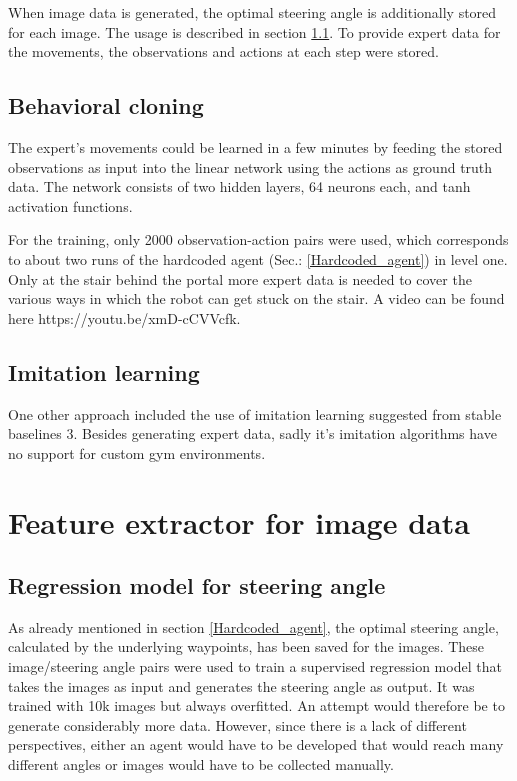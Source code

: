 \documentclass[conference]{IEEEtran}
\begin{document}
When image data is generated, the optimal steering angle is additionally stored for each image. The usage is described in section \ref{Regression_model}. To provide expert data for the movements, the observations and actions at each step were stored.

\subsection{Behavioral cloning}   \label{Behavioral_cloning}
The expert's movements could be learned in a few minutes by feeding the stored observations as input into the linear network using the actions as ground truth data. The network consists of two hidden layers, 64 neurons each, and tanh activation functions.

For the training, only 2000 observation-action pairs were used, which corresponds to about two runs of the hardcoded agent (Sec.: \ref{Hardcoded_agent}) in level one. Only at the stair behind the portal more expert data is needed to cover the various ways in which the robot can get stuck on the stair. A video can be found here https://youtu.be/xmD-cCVVcfk.

\subsection{Imitation learning}
One other approach included the use of imitation learning \cite{imitation} suggested from stable baselines 3. Besides generating expert data, sadly it's imitation algorithms have no support for custom gym environments.

\section{Feature extractor for image data}
\subsection{Regression model for steering angle} \label{Regression_model}
As already mentioned in section \ref{Hardcoded_agent}, the optimal steering angle, calculated by the underlying waypoints, has been saved for the images. These image/steering angle pairs were used to train a supervised regression model that takes the images as input and generates the steering angle as output. It was trained with 10k images but always overfitted. An attempt would therefore be to generate considerably more data. However, since there is a lack of different perspectives, either an agent would have to be developed that would reach many different angles or images would have to be collected manually. %
\end{document}
